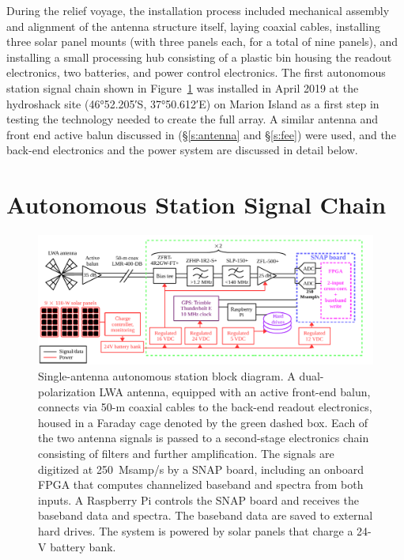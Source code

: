 During the relief voyage, the installation process included mechanical assembly and alignment of the antenna structure itself, laying coaxial cables, installing three solar panel mounts (with three panels each, for a total of nine panels), and installing a small processing hub consisting of a plastic bin housing the readout electronics, two batteries, and power control electronics. The first autonomous station signal chain shown in Figure~\ref{Fig:albatros1_schem} was installed in April 2019 at the hydroshack site (\ang{46;52.205;}S, \ang{37;50.612;}E) on Marion Island as a first step in testing the technology needed to create the full array. A similar antenna and front end active balun discussed in (\S\ref{s:antenna} and \S\ref{s:fee}) were used, and the back-end electronics and the power system are discussed in detail below.

\section{Autonomous Station Signal Chain}

\begin{figure}
	\begin{center}
		\includegraphics[width=\linewidth]{Figures/albatros_single_schematic.pdf}
		\caption{Single-antenna autonomous station block diagram. A dual-polarization LWA antenna, equipped with an active front-end balun, connects via 50-m coaxial cables to the back-end readout electronics, housed in a Faraday cage denoted by the green dashed box. Each of the two antenna signals is passed to a second-stage electronics chain consisting of filters and further amplification.  The signals are digitized at 250~Msamp/s by a SNAP board, including an onboard FPGA that computes channelized baseband and spectra from both inputs.  A Raspberry Pi controls the SNAP board and receives the baseband data and spectra. The baseband data are saved to external hard drives. The system is powered by solar panels that charge a 24-V battery bank. }
		\label{Fig:albatros1_schem}
	\end{center}
\end{figure}

